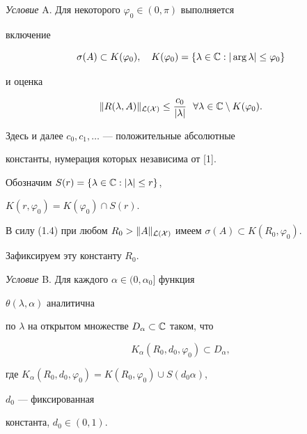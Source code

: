 {\it Условие} A. Для некоторого $\varphi_0\in(0,\pi)$ выполняется 


включение


\begin{equation}


\sigma(A)\subset K(\varphi_0),\quad


K(\varphi_0)=\{\lambda\in\Bbb C:|\arg\lambda|\le\varphi_0\}


\end{equation}


и оценка


\begin{equation}


\|R(\lambda,A)\|_\CL\le\frac{c_0}{|\lambda|}


\ \ \forall\lambda\in\Bbb C\setminus K(\varphi_0).


\end{equation}





Здесь и далее $c_0,c_1,\dotsc$ --- положительные абсолютные 


константы, нумерация которых независима от [1].





Обозначим $S(r)=\{\lambda\in\Bbb C:|\lambda|\le r\}$, 


$K(r,\varphi_0)=K(\varphi_0)\cap S(r)$.


В силу (1.4) при любом $R_0>\|A\|_\CL$ имеем $\sigma(A)\subset 


K(R_0,\varphi_0)$.


Зафиксируем эту константу $R_0$.


\medskip





{\it Условие} B. Для каждого $\alpha\in(0,\alpha_0]$ функция 


$\theta(\lambda,\alpha)$ аналитична


по $\lambda$ на открытом множестве $D_\alpha\subset\Bbb C$ таком, что 


$$


K_\alpha(R_0,d_0,\varphi_0)\subset D_\alpha,


$$


где $K_\alpha(R_0,d_0,\varphi_0)= K(R_0,\varphi_0)\cup S(d_0\alpha)$, 


$d_0$ --- фиксированная 


константа, $d_0\in(0,1)$.






